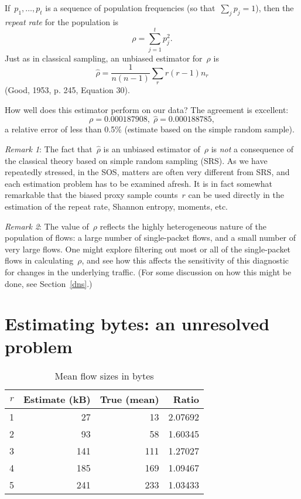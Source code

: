 \documentclass{paper}
\begin{document}
If~$p_1, \dots, p_t$ is a sequence of population frequencies (so that~$\sum_j
p_j = 1$), then the \emph{repeat rate} for the population is
$$ \rho = \sum_{j=1}^t p_j^2. $$
Just as in classical sampling, an unbiased estimator for~$\rho$ is
$$ \hat{\rho} = \frac{1}{n(n-1)} \sum_r r(r-1)n_r $$
(Good, 1953, p. 245, Equation 30).

How well does this estimator perform on our data? The agreement is excellent:
$$ \rho = 0.000187908,\; \hat{\rho}= 0.000188785, $$
a relative error of less than 0.5\% (estimate based on the simple random
sample).

\emph{Remark 1}: The fact that~$\hat{\rho}$ is an unbiased estimator of~$\rho$
is \emph{not} a consequence of the classical theory based on simple random
sampling (SRS). As we have repeatedly stressed, in the SOS, matters are often
very different from SRS, and each estimation problem has to be examined afresh.
It is in fact somewhat remarkable that the biased proxy sample counts~$r$ can be
used directly in the estimation of the repeat rate, Shannon entropy, moments,
etc.

\emph{Remark 2}: The value of~$\rho$ reflects the highly heterogeneous nature of
the population of flows: a large number of single-packet flows, and a small
number of very large flows. One might explore filtering out most or all of the
single-packet flows in calculating~$\rho$, and see how this affects the
sensitivity of this diagnostic for changes in the underlying traffic. (For some
discussion on how this might be done, see Section~\ref{dns}.)

\section{Estimating bytes: an unresolved problem}

\begin{table}
\begin{center}
\begin{tabular}{r r r r}
$r$ & Estimate (kB) & True (mean) & Ratio \\
\midrule
1 &  27 &  13 & 2.07692 \\
2 &  93 &  58 & 1.60345 \\
3 & 141 & 111 & 1.27027 \\
4 & 185 & 169 & 1.09467 \\
5 & 241 & 233 & 1.03433 \\
\end{tabular}
\caption{Mean flow sizes in bytes}
\label{flow_sizes}
\end{center}
\end{table}
\end{document}
